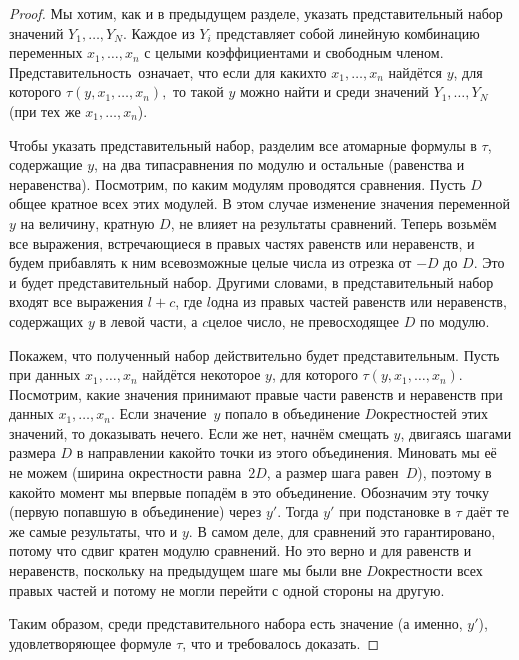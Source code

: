 \begin{proof}
        \label{presburger-set}%
Мы хотим, как и в предыдущем разделе, указать представительный
набор значений
$Y_1,\dots,Y_N$. Каждое из $Y_i$ представляет собой
линейную комбинацию переменных $x_1,\dots,x_n$ с целыми
коэффициентами и свободным членом.  Представительность\
означает, что если для каких\д то $x_1,\dots,x_n$ найдётся $y$,
для которого
        $
\tau(y,x_1,\dots,x_n),
        $
то такой $y$ можно найти и среди значений $Y_1,\dots,Y_N$ (при
тех же $x_1,\dots,x_n$).

Чтобы указать представительный набор, разделим все атомарные
формулы в $\tau$, содержащие $y$, на два типа\т сравнения по
модулю и остальные (равенства и неравенства). Посмотрим, по
каким модулям проводятся сравнения. Пусть $D$\т общее кратное
всех этих модулей. В этом случае изменение значения переменной
$y$ на величину, кратную $D$, не влияет на результаты сравнений.
Теперь возьмём все выражения, встречающиеся в правых
частях равенств или неравенств, и будем прибавлять к ним
всевозможные целые числа из отрезка от $-D$ до $D$. Это и будет
представительный набор. Другими словами, в представительный
набор входят все выражения $l+c$, где $l$\т одна из правых
частей равенств или неравенств, содержащих $y$ в левой части, а
$c$\т целое число, не превосходящее $D$ по модулю.

Покажем, что полученный набор действительно будет
представительным. Пусть при данных $x_1,\dots,x_n$ найдётся
некоторое $y$, для которого $\tau(y,x_1,\dots,x_n)$. Посмотрим,
какие значения принимают правые части равенств и неравенств при
данных $x_1,\dots,x_n$. Если значение~$y$ попало в объединение
$D$\д окрестностей этих значений, то доказывать нечего. Если же
нет, начнём смещать $y$, двигаясь шагами размера $D$ в
направлении какой\д то точки из этого объединения. Миновать мы её
не можем (ширина окрестности равна~$2D$, а размер шага
равен~$D$), поэтому в какой\д то момент мы впервые попадём в это
объединение. Обозначим эту точку (первую попавшую в объединение)
через $y'$. Тогда $y'$ при подстановке в $\tau$ даёт те же самые
результаты, что и $y$. В самом деле, для сравнений это
гарантировано, потому что сдвиг кратен модулю сравнений. Но это
верно и для равенств и неравенств, поскольку на предыдущем шаге
мы были вне $D$\д окрестности всех правых частей и потому не
могли перейти с одной стороны на другую.

Таким образом, среди представительного набора есть значение (а
именно, $y'$), удовлетворяющее формуле $\tau$, что и требовалось
доказать.
\end{proof}

